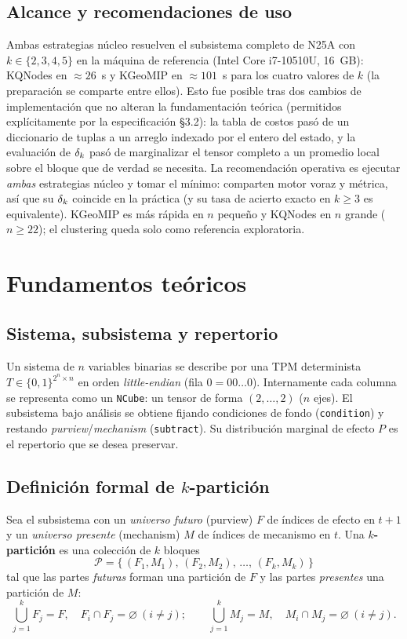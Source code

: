 \documentclass[11pt,letterpaper]{article}
\begin{document}
\subsection{Alcance y recomendaciones de uso}
Ambas estrategias núcleo resuelven el subsistema completo de N25A con
$k\in\{2,3,4,5\}$ en la máquina de referencia (Intel Core i7-10510U, 16~GB): KQNodes en
$\approx 26$~s y KGeoMIP en $\approx 101$~s para los cuatro valores de $k$ (la preparación se comparte entre
ellos). Esto fue posible tras dos cambios de implementación que no alteran la
fundamentación teórica (permitidos explícitamente por la especificación §3.2):
la tabla de costos pasó de un diccionario de tuplas a un arreglo indexado por el
entero del estado, y la evaluación de $\delta_k$ pasó de marginalizar el tensor
completo a un promedio local sobre el bloque que de verdad se necesita. La
recomendación operativa es ejecutar \emph{ambas} estrategias núcleo y tomar el
mínimo: comparten motor voraz y métrica, así que su $\delta_k$ coincide en la práctica
(y su tasa de acierto exacto en $k\ge 3$ es equivalente). KGeoMIP es más rápida en
$n$ pequeño y KQNodes en $n$ grande ($n\ge 22$); el clustering queda solo como
referencia exploratoria.

\section{Fundamentos teóricos}
\label{sec:fundamentos}

\subsection{Sistema, subsistema y repertorio}
Un sistema de $n$ variables binarias se describe por una TPM determinista
$T \in \{0,1\}^{2^n \times n}$ en orden \emph{little-endian} (fila $0 = 00\dots0$).
Internamente cada columna se representa como un \texttt{NCube}: un tensor de forma
$(2,\dots,2)$ ($n$ ejes). El subsistema bajo análisis se obtiene fijando
condiciones de fondo (\texttt{condition}) y restando \emph{purview}/\emph{mechanism}
(\texttt{subtract}). Su distribución marginal de efecto $P$ es el repertorio que
se desea preservar.

\subsection{Definición formal de $k$-partición}
\label{sec:def-kpart}
Sea el subsistema con un \emph{universo futuro} (purview) $F$ de índices de
efecto en $t{+}1$ y un \emph{universo presente} (mechanism) $M$ de índices de
mecanismo en $t$. Una \textbf{$k$-partición} es una colección de $k$ bloques
\[
	\mathcal{P} = \{\,(F_1,M_1),\,(F_2,M_2),\,\dots,\,(F_k,M_k)\,\}
\]
tal que las partes \emph{futuras} forman una partición de $F$ y las partes
\emph{presentes} una partición de $M$:
\[
	\bigcup_{j=1}^{k} F_j = F,\quad F_i \cap F_j=\varnothing\ (i\neq j);
	\qquad
	\bigcup_{j=1}^{k} M_j = M,\quad M_i \cap M_j=\varnothing\ (i\neq j).
\]
\end{document}
